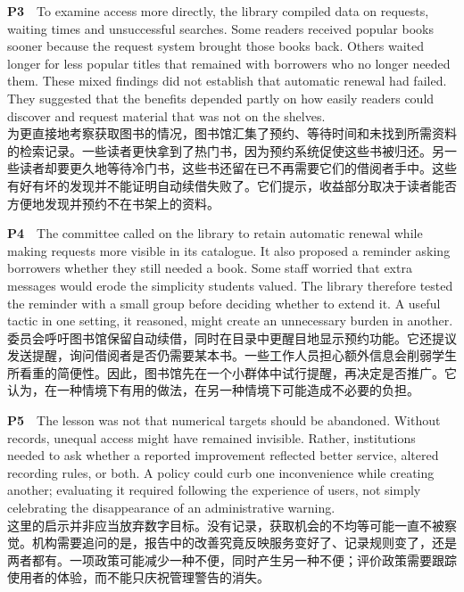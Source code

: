 \documentclass[a4paper,11pt,openany]{report}
\newcommand{\zhline}[1]{{\CJKsf\color{bodygrey}#1}}
\begin{document}
\begin{samepage}
\textbf{P3}　To examine access more directly, the library compiled data on requests, waiting times and unsuccessful searches. Some readers received popular books sooner because the request system brought those books back. Others waited longer for less popular titles that remained with borrowers who no longer needed them. These mixed findings did not establish that automatic renewal had failed. They suggested that the benefits depended partly on how easily readers could discover and request material that was not on the shelves.\\
\zhline{为更直接地考察获取图书的情况，图书馆汇集了预约、等待时间和未找到所需资料的检索记录。一些读者更快拿到了热门书，因为预约系统促使这些书被归还。另一些读者却要更久地等待冷门书，这些书还留在已不再需要它们的借阅者手中。这些有好有坏的发现并不能证明自动续借失败了。它们提示，收益部分取决于读者能否方便地发现并预约不在书架上的资料。}
\par\end{samepage}

\begin{samepage}
\textbf{P4}　The committee called on the library to retain automatic renewal while making requests more visible in its catalogue. It also proposed a reminder asking borrowers whether they still needed a book. Some staff worried that extra messages would erode the simplicity students valued. The library therefore tested the reminder with a small group before deciding whether to extend it. A useful tactic in one setting, it reasoned, might create an unnecessary burden in another.\\
\zhline{委员会呼吁图书馆保留自动续借，同时在目录中更醒目地显示预约功能。它还提议发送提醒，询问借阅者是否仍需要某本书。一些工作人员担心额外信息会削弱学生所看重的简便性。因此，图书馆先在一个小群体中试行提醒，再决定是否推广。它认为，在一种情境下有用的做法，在另一种情境下可能造成不必要的负担。}
\par\end{samepage}

\begin{samepage}
\textbf{P5}　The lesson was not that numerical targets should be abandoned. Without records, unequal access might have remained invisible. Rather, institutions needed to ask whether a reported improvement reflected better service, altered recording rules, or both. A policy could curb one inconvenience while creating another; evaluating it required following the experience of users, not simply celebrating the disappearance of an administrative warning.\\
\zhline{这里的启示并非应当放弃数字目标。没有记录，获取机会的不均等可能一直不被察觉。机构需要追问的是，报告中的改善究竟反映服务变好了、记录规则变了，还是两者都有。一项政策可能减少一种不便，同时产生另一种不便；评价政策需要跟踪使用者的体验，而不能只庆祝管理警告的消失。}
\par\end{samepage}
\end{document}
